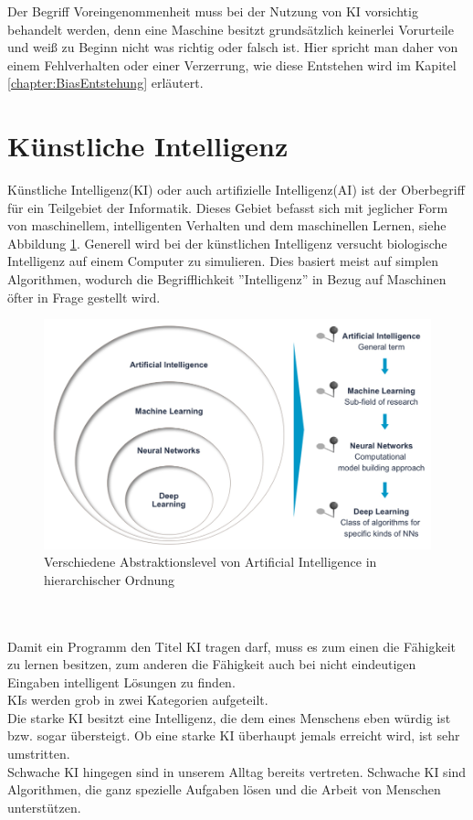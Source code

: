 \documentclass[12pt,oneside,a4paper,parskip]{scrbook}
\begin{document}
Der Begriff Voreingenommenheit muss bei der Nutzung von KI vorsichtig behandelt werden, denn eine Maschine besitzt grundsätzlich keinerlei Vorurteile und weiß zu Beginn nicht was richtig oder falsch ist. Hier spricht man daher von einem Fehlverhalten oder einer Verzerrung, wie diese Entstehen wird im Kapitel \ref{chapter:BiasEntstehung} erläutert.
\section{Künstliche Intelligenz}
Künstliche Intelligenz(KI) oder auch artifizielle Intelligenz(AI) ist der Oberbegriff für ein Teilgebiet der Informatik. Dieses Gebiet befasst sich mit jeglicher Form von maschinellem, intelligenten Verhalten und dem maschinellen Lernen, siehe Abbildung \ref{fig:Uebersicht}. Generell wird bei der künstlichen Intelligenz versucht biologische Intelligenz auf einem Computer zu simulieren. Dies basiert meist auf simplen Algorithmen, wodurch die Begrifflichkeit ''Intelligenz'' in Bezug auf Maschinen öfter in Frage gestellt wird.
\begin{figure}[ht]
	\begin{center}
		\includegraphics[width=14cm]{Bilder/Abstraktionslevel_von_AI.jpg}
		\caption{Verschiedene Abstraktionslevel von Artificial Intelligence in hierarchischer Ordnung}
		\label{fig:Uebersicht}
	\end{center}
\end{figure}
\\\\Damit ein Programm den Titel KI tragen darf, muss es zum einen die Fähigkeit zu lernen besitzen, zum anderen die Fähigkeit auch bei nicht eindeutigen Eingaben intelligent Lösungen zu finden.\\
KIs werden grob in zwei Kategorien aufgeteilt.\\
Die starke KI besitzt eine Intelligenz, die dem eines Menschens eben würdig ist bzw. sogar übersteigt. Ob eine starke KI überhaupt jemals erreicht wird, ist sehr umstritten. \\Schwache KI hingegen sind in unserem Alltag bereits vertreten. Schwache KI sind Algorithmen, die ganz spezielle Aufgaben lösen und die Arbeit von Menschen unterstützen.
\end{document}
